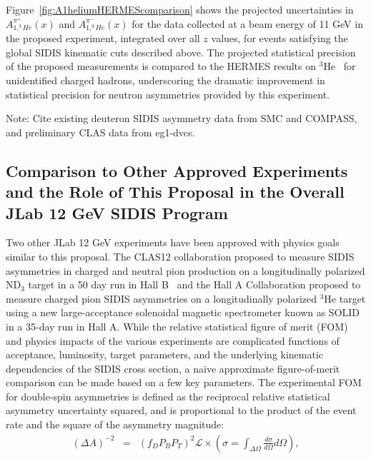Figure~\ref{fig:A1heliumHERMEScomparison} shows the projected uncertainties in $A_{1,^3He}^{\pi^+}(x)$ and $A_{1,^3He}^{\pi^-}(x)$ for the data collected at a beam energy of 11 GeV in the proposed experiment, integrated over all $z$ values, for events satisfying the global SIDIS kinematic cuts described above. The projected statistical precision of the proposed measurements is compared to the HERMES results on $^3$He~\cite{Ackerstaff:1999ey} for unidentified charged hadrons, underscoring the dramatic improvement in statistical precision for neutron asymmetries provided by this experiment. 

Note: Cite existing deuteron SIDIS asymmetry data from SMC and COMPASS, and preliminary CLAS data from eg1-dvcs.
\subsection{Comparison to Other Approved Experiments and the Role of This Proposal in the Overall JLab 12 GeV SIDIS Program}
Two other JLab 12 GeV experiments have been approved with physics goals similar to this proposal. The CLAS12 collaboration proposed to measure SIDIS asymmetries in charged and neutral pion production on a longitudinally polarized ND$_3$ target in a 50 day run in Hall B~\cite{CLAS12_ND3_longitudinal} and the Hall A Collaboration proposed to measure charged pion SIDIS asymmetries on a longitudinally polarized $^3$He target using a new large-acceptance solenoidal magnetic spectrometer known as SOLID~\cite{SOLID_He3_longitudinal} in a 35-day run in Hall A. While the relative statistical figure of merit (FOM) and physics impacts of the various experiments are complicated functions of acceptance, luminosity, target parameters, and the underlying kinematic dependencies of the SIDIS cross section, a naive approximate figure-of-merit comparison can be made based on a few key parameters. The experimental FOM for double-spin asymmetries is defined as the reciprocal relative statistical asymmetry uncertainty squared, and is proportional to the product of the event rate and the square of the asymmetry magnitude: 
\begin{eqnarray}
  (\Delta A)^{-2} &=& (f_D P_B P_T)^2 \mathcal{L} \times \left( \sigma = \int_{\Delta \Omega} \frac{d\sigma}{d\Omega} d \Omega \right), 
\end{eqnarray} 

